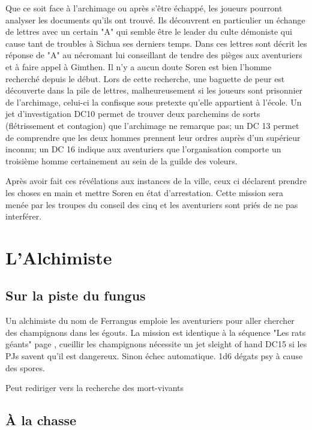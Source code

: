 Que ce soit face à l'archimage ou après s'être échappé, les joueurs pourront analyser les documents
qu'ils ont trouvé. Ils découvrent en particulier un échange de lettres avec un certain "A" qui semble
être le leader du culte démoniste qui cause tant de troubles à Sichua ses derniers temps. Dans ces lettres
sont décrit les réponse de "A" au nécromant lui conseillant de tendre des pièges aux aventuriers et à
faire appel à Gimthen. Il n'y a aucun doute Soren est bien l'homme recherché depuis le début. Lors
de cette recherche, une baguette de peur est découverte dans la pile de lettres, malheureusement si les
joueurs sont prisonnier de l'archimage, celui-ci la confisque sous pretexte qu'elle appartient à l'école.
Un jet d'investigation DC10 permet de trouver deux parchemins de sorts (flétrissement et contagion) que
l'archimage ne remarque pas; un DC 13 permet de comprendre que les deux hommes prennent leur ordres auprès 
d'un supérieur inconnu; un DC 16 indique aux aventuriers que l'organisation comporte un troisième homme
certainement au sein de la guilde des voleurs.

Après avoir fait ces révélations aux instances de la ville, ceux ci déclarent prendre les choses en
main et mettre Soren en état d'arrestation. Cette mission sera menée par les troupes du conseil des
cinq et les aventuriers sont priés de ne pas interférer.


\section{L'Alchimiste}

\subsection{Sur la piste du fungus}

Un alchimiste du nom de Ferrangus emploie les aventuriers pour aller chercher des champignons dans les
égouts. La mission est identique à la séquence "Les rats géants" page \pageref{ss:RatsGeants}, cueillir 
les champignons nécessite un jet sleight of hand DC15
si les PJs savent qu'il est dangereux. Sinon échec automatique. 1d6 dégats psy à cause des spores.

Peut rediriger vers la recherche des mort-vivants 

\subsection{À la chasse}

